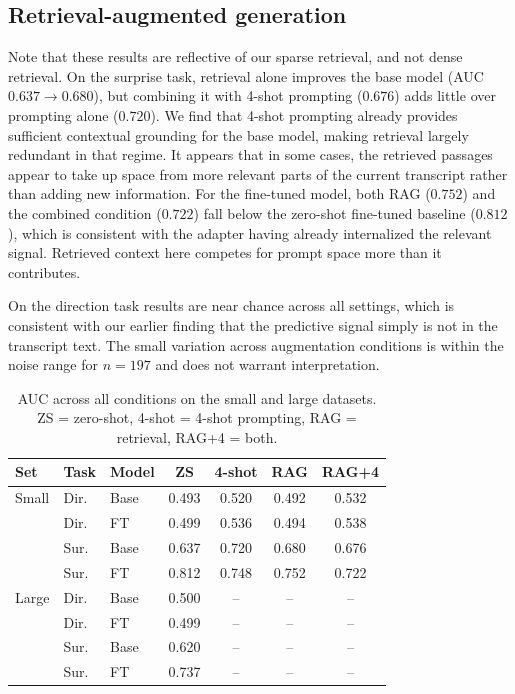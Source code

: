 \documentclass[11pt]{article}
\begin{document}
\subsection{Retrieval-augmented generation}

Note that these results are reflective of our sparse retrieval, and not dense retrieval. On the surprise task, retrieval alone improves the base model
(AUC $0.637\rightarrow0.680$), but combining it with 4-shot prompting
($0.676$) adds little over prompting alone ($0.720$). We find that
4-shot prompting already provides sufficient contextual grounding for
the base model, making retrieval largely redundant in that regime. It appears that in some cases, the retrieved passages appear to take up space from more relevant
parts of the current transcript rather than adding new information.
For the fine-tuned model, both RAG ($0.752$) and the combined
condition ($0.722$) fall below the zero-shot fine-tuned baseline
($0.812$), which is consistent with the adapter having already
internalized the relevant signal. Retrieved context here competes
for prompt space more than it contributes.

On the direction task results are near chance across all settings,
which is consistent with our earlier finding that the predictive
signal simply is not in the transcript text. The small variation
across augmentation conditions is within the noise range for
$n=197$ and does not warrant interpretation.

\begin{table}[!ht]
\centering
\small
\setlength{\tabcolsep}{4pt}
\begin{tabular}{lllcccc}
\toprule
\textbf{Set} & \textbf{Task} & \textbf{Model} & \textbf{ZS} & \textbf{4-shot} & \textbf{RAG} & \textbf{RAG+4} \\
\midrule
Small & Dir. & Base & 0.493 & 0.520 & 0.492 & 0.532 \\
      & Dir. & FT   & 0.499 & 0.536 & 0.494 & 0.538 \\
      & Sur.  & Base & 0.637 & 0.720 & 0.680 & 0.676 \\
      & Sur.  & FT   & 0.812 & 0.748 & 0.752 & 0.722 \\
\midrule
Large & Dir. & Base & 0.500 & --    & --    & -- \\
      & Dir. & FT   & 0.499 & --    & --    & -- \\
      & Sur.  & Base & 0.620 & --    & --    & -- \\
      & Sur.  & FT   & 0.737 & --    & --    & -- \\
\bottomrule
\end{tabular}
\caption{AUC across all conditions on the small and large datasets.
ZS = zero-shot, 4-shot = 4-shot prompting, RAG = retrieval, RAG+4
= both.}
\label{tab:all-results}
\end{table}
\end{document}
